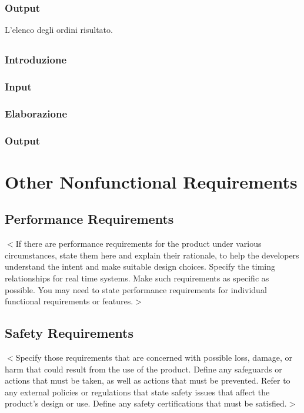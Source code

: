 \documentclass{scrreprt}
\begin{document}
\subsection*{Output}
L'elenco degli ordini risultato.

\section{}

\subsection*{Introduzione}
\subsection*{Input}
\subsection*{Elaborazione}
\subsection*{Output}


\chapter{Other Nonfunctional Requirements}

\section{Performance Requirements}
$<$If there are performance requirements for the product under various 
circumstances, state them here and explain their rationale, to help the 
developers understand the intent and make suitable design choices. Specify the 
timing relationships for real time systems. Make such requirements as specific 
as possible. You may need to state performance requirements for individual 
functional requirements or features.$>$

\section{Safety Requirements}
$<$Specify those requirements that are concerned with possible loss, damage, or 
harm that could result from the use of the product. Define any safeguards or 
actions that must be taken, as well as actions that must be prevented. Refer to 
any external policies or regulations that state safety issues that affect the 
product’s design or use. Define any safety certifications that must be 
satisfied.$>$
\end{document}

